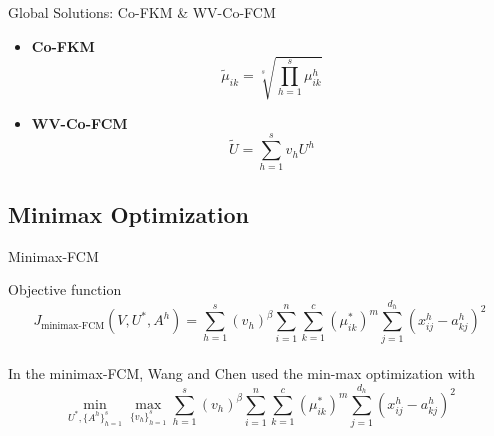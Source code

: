 \documentclass[compress,sky blue]{beamer}
\begin{document}


\begin{frame}{Global Solutions: Co-FKM \& WV-Co-FCM}
	\vspace{-0.3cm}	    

\begin{itemize}
\item \textbf{Co-FKM}\begin{equation}
\tilde{\mu}_{ik} = \sqrt[s]{\prod_{h=1}^{s}  \mu_{ik}^{h}}
\label{SCoFKM} 
\end{equation}
\item \textbf{WV-Co-FCM }\begin{equation}
\tilde{U} =  \sum_{h=1}^{s} v_{h} U^{h}
\label{SWVCoFCM} 
\end{equation}

\end{itemize}



\end{frame}





\subsection{Minimax Optimization}

\begin{frame}{Minimax-FCM}
	\vspace{-0.3cm}	
    
    Objective function     
\begin{equation}
J_{\text{minimax-FCM}} \left (V, U^{*}, A^{h} \right ) = \sum_{h=1}^{s} \left (v_{h} \right )^{\beta} \sum_{i=1}^{n}\sum_{k=1}^{c} \left(\mu_{ik}^{*} \right)^{m} \sum_{j=1}^{d_{h}}\left(x_{ij}^{h}-a_{kj}^{h}\right)^2
\label{MinimaxFCM} 
\end{equation}
\vspace{-0.2cm}	
\\In the minimax-FCM, Wang and Chen \cite{Wang2017Multi-viewSources} used the min-max optimization with 
\begin{equation*}
\min\limits_{U^{*}, \{ A^{h}\}_{h=1}^{s}}   \max\limits_{ \{ v_{h}\}_{h=1}^{s}}   \sum_{h=1}^{s} \left (v_{h} \right )^{\beta} \sum_{i=1}^{n}\sum_{k=1}^{c} \left(\mu_{ik}^{*} \right)^{m} \sum_{j=1}^{d_{h}}\left(x_{ij}^{h}-a_{kj}^{h}\right)^2
\label{MinimaxFCM} 
\end{equation*}
\end{frame}
\end{document}

